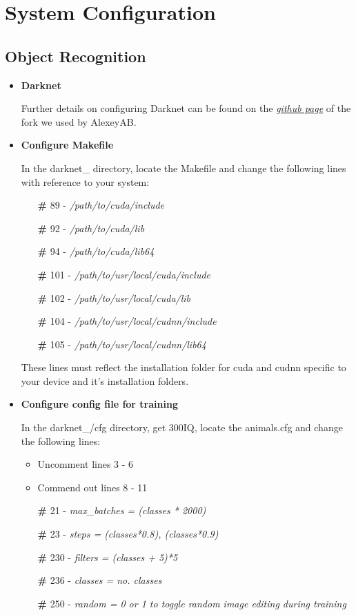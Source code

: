 \chapter{System Configuration}
\section{Object Recognition}

\begin{itemize}
\item \textbf{Darknet}

Further details on configuring Darknet can be found on the \href{https://github.com/AlexeyAB/darknet}{\textit{github page}} of the fork we used by AlexeyAB.

\item \textbf{Configure Makefile}

In the darknet\_ directory, locate the Makefile and change the following lines with reference to your system:

\begin{itemize}
    \item[\textbf{\#}] 89  - \textit{/path/to/cuda/include}
    \item[\textbf{\#}] 92 - \textit{/path/to/cuda/lib}
    \item[\textbf{\#}] 94 - \textit{/path/to/cuda/lib64}
    \item[\textbf{\#}] 101 - \textit{/path/to/usr/local/cuda/include}
    \item[\textbf{\#}] 102 - \textit{/path/to/usr/local/cuda/lib}
    \item[\textbf{\#}] 104 - \textit{/path/to/usr/local/cudnn/include}
    \item[\textbf{\#}] 105 - \textit{/path/to/usr/local/cudnn/lib64}
\end{itemize}

These lines must reflect the installation folder for cuda and cudnn specific to your device and it's installation folders.

\item \textbf{Configure config file for training}

In the darknet\_/cfg directory, get 300IQ, locate the animals.cfg and change the following lines:

\begin{itemize}
    \item Uncomment lines 3 - 6
    \item Commend out lines 8 - 11
    \item[\textbf{\#}] 21  - \textit{max\_batches = (classes * 2000)}
    \item[\textbf{\#}] 23 - \textit{steps = (classes*0.8), (classes*0.9)}
    \item[\textbf{\#}] 230 - \textit{filters = (classes + 5)*5}
    \item[\textbf{\#}] 236 - \textit{classes = no. classes}
    \item[\textbf{\#}] 250 - \textit{random = 0 or 1 to toggle random image editing during training}
\end{itemize}


\end{itemize}
